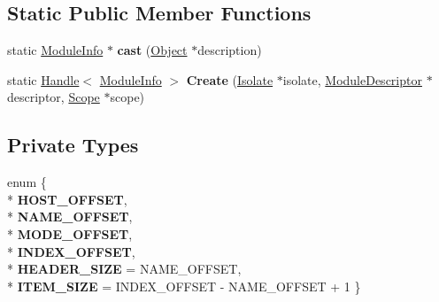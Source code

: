 \subsection*{Static Public Member Functions}
\begin{DoxyCompactItemize}
\item 
static \hyperlink{classv8_1_1internal_1_1_module_info}{Module\+Info} $\ast$ {\bfseries cast} (\hyperlink{classv8_1_1internal_1_1_object}{Object} $\ast$description)\hypertarget{classv8_1_1internal_1_1_module_info_a43f619b534925ef73d217c2d202b9bc4}{}\label{classv8_1_1internal_1_1_module_info_a43f619b534925ef73d217c2d202b9bc4}

\item 
static \hyperlink{classv8_1_1internal_1_1_handle}{Handle}$<$ \hyperlink{classv8_1_1internal_1_1_module_info}{Module\+Info} $>$ {\bfseries Create} (\hyperlink{classv8_1_1internal_1_1_isolate}{Isolate} $\ast$isolate, \hyperlink{classv8_1_1internal_1_1_module_descriptor}{Module\+Descriptor} $\ast$descriptor, \hyperlink{classv8_1_1internal_1_1_scope}{Scope} $\ast$scope)\hypertarget{classv8_1_1internal_1_1_module_info_ac600b184cb9fc1ba31317dfbed1a3afd}{}\label{classv8_1_1internal_1_1_module_info_ac600b184cb9fc1ba31317dfbed1a3afd}

\end{DoxyCompactItemize}
\subsection*{Private Types}
\begin{DoxyCompactItemize}
\item 
enum \{ \\*
{\bfseries H\+O\+S\+T\+\_\+\+O\+F\+F\+S\+ET}, 
\\*
{\bfseries N\+A\+M\+E\+\_\+\+O\+F\+F\+S\+ET}, 
\\*
{\bfseries M\+O\+D\+E\+\_\+\+O\+F\+F\+S\+ET}, 
\\*
{\bfseries I\+N\+D\+E\+X\+\_\+\+O\+F\+F\+S\+ET}, 
\\*
{\bfseries H\+E\+A\+D\+E\+R\+\_\+\+S\+I\+ZE} = N\+A\+M\+E\+\_\+\+O\+F\+F\+S\+ET, 
\\*
{\bfseries I\+T\+E\+M\+\_\+\+S\+I\+ZE} = I\+N\+D\+E\+X\+\_\+\+O\+F\+F\+S\+ET -\/ N\+A\+M\+E\+\_\+\+O\+F\+F\+S\+ET + 1
 \}\hypertarget{classv8_1_1internal_1_1_module_info_a46dde48423be0fc2436087788a78a146}{}\label{classv8_1_1internal_1_1_module_info_a46dde48423be0fc2436087788a78a146}

\end{DoxyCompactItemize}
